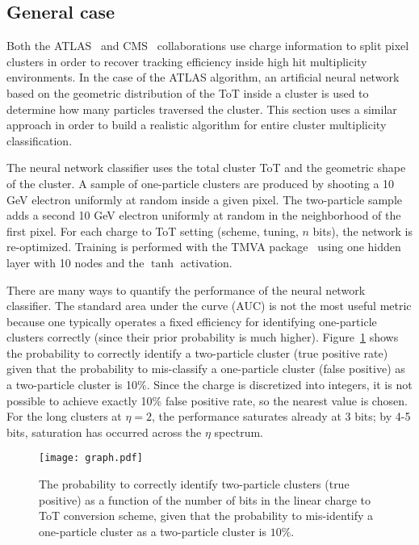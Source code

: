 \documentclass[12pt]{article}
\begin{document}
\subsection{General case}
\label{sec:class:general}


Both the ATLAS~\cite{Aad:2014yva} and CMS~\cite{tidecms} collaborations use charge information to split pixel clusters in order to recover tracking efficiency inside high hit multiplicity environments.  In the case of the ATLAS algorithm, an artificial neural network based on the geometric distribution of the ToT inside a cluster is used to determine how many particles traversed the cluster.  This section uses a similar approach in order to build a realistic algorithm for entire cluster multiplicity classification.  

The neural network classifier uses the total cluster ToT and the geometric shape of the cluster.  A sample of one-particle clusters are produced by shooting a 10 GeV electron uniformly at random inside a given pixel.  The two-particle sample adds a second 10 GeV electron uniformly at random in the neighborhood of the first pixel.  For each charge to ToT setting (scheme, tuning, $n$ bits), the network is re-optimized.  Training is performed with the TMVA package~\cite{Hocker:2007ht} using one hidden layer with 10 nodes and the $\tanh$ activation.  


There are many ways to quantify the performance of the neural network classifier.  The standard area under the curve (AUC) is not the most useful metric because one typically operates a fixed efficiency for identifying one-particle clusters correctly (since their prior probability is much higher).  Figure~\ref{fig:TwoParticleID:NN1} shows the probability to correctly identify a two-particle cluster (true positive rate) given that the probability to mis-classify a one-particle cluster (false positive) as a two-particle cluster is 10\%.  Since the charge is discretized into integers, it is not possible to achieve exactly 10\% false positive rate, so the nearest value is chosen.  For the long clusters at $\eta=2$, the performance saturates already at 3 bits; by 4-5 bits, saturation has occurred across the $\eta$ spectrum.

\begin{figure}[h!]
\centering
\texttt{[image: graph.pdf]}
\caption{The probability to correctly identify two-particle clusters (true positive) as a function of the number of bits in the linear charge to ToT conversion scheme, given that the probability to mis-identify a one-particle cluster as a two-particle cluster is $10\%$. }
\label{fig:TwoParticleID:NN1}
\end{figure}
\end{document}

